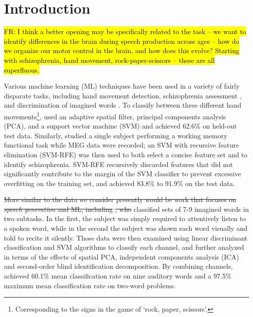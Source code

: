 \documentclass[utf8]{frontiersSCNS} %
\newcommand{\FR}[1]{{\small \textcolor{red}{\hl{FR: #1}}}}
\begin{document}
\section{Introduction}



\FR{I think a better opening may be specifically related to the task -- we want to identify differences in the brain during speech production across ages -- how do we organize our motor control in the brain, and how does this evolve? Starting with schizophrenia, hand movement, rock-paper-scissors -- these are all superfluous.}

Various machine learning (ML) techniques have been used in a variety of fairly disparate tasks, including hand movement detection\cite{Asano2009}, schizophrenia assessment \cite{Ince2008}, and discrimination of imagined words \cite{Guimaraes2007}. To classify between three different hand movements\footnote{Corresponding to the signs in the game of `rock, paper, scissors'.}, \cite{Asano2009} used an adaptive spatial filter, principal components analysis (PCA), and a support vector machine (SVM) and achieved 62.6\% on held-out test data. Similarly, \cite{Ince2008} studied a single subject performing a working memory functional task while MEG data were recorded; an SVM with recursive feature elimination (SVM-RFE) was then used to both select a concise feature set and to identify schizophrenia. SVM-RFE recursively discarded features that did not significantly contribute to the margin of the SVM classifier to prevent excessive overfitting on the training set, and achieved 83.8\% to 91.9\% on the test data.

\st{More similar to the data we consider presently would be work that focuses on \emph{speech generation} and ML, including} \cite{Guimaraes2007}\st{, who} classified sets of 7-9 imagined words in two subtasks. In the first, the subject was simply required to attentively listen to a spoken word, while in the second the subject was shown each word visually and told to recite it silently. Those data were then examined using linear discriminant classification and SVM algorithms to classify each channel, and further analyzed in terms of the effects of spatial PCA, independent components analysis (ICA) and second-order blind identification decomposition. By combining channels, \cite{Guimaraes2007} achieved 60.1\% mean classification rate on nine auditory words and a 97.5\% maximum mean classification rate on two-word problems.
\end{document}
